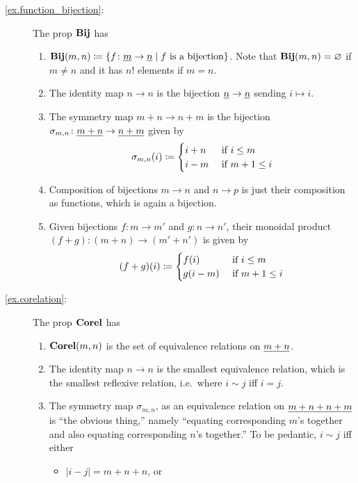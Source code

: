 \documentclass[7Sketches]{subfiles}
\begin{document}
{
\begin{description}
	\item[\cref{ex.function_bijection}:] The prop $\mathbf{Bij}$ has
	\begin{enumerate}
		\item $\mathbf{Bij}(m,n)\coloneqq\{f\colon\underline{{m}}\to\underline{{n}}\mid f\text{ is a bijection}\}$. Note that $\mathbf{Bij}(m,n)=\varnothing$ if $m\neq n$ and it has $n!$ elements if $m=n$.
		\item The identity map $n\to n$ is the bijection $\underline{{n}}\to\underline{{n}}$ sending $i\mapsto i$.
		\item The symmetry map $m+n\to n+m$ is the bijection $\sigma_{m,n}\colon\underline{{m+n}}\to\underline{{n+m}}$ given by
		\[
  		\sigma_{m,n}(i)\coloneqq
  		\begin{cases}
  			i+n&\textnormal{ if }i\leq m\\
				i-m&\textnormal{ if }m+1\leq i
  		\end{cases}
		\]
		\item Composition of bijections $m\to n$ and $n\to p$ is just their composition as functions, which is again a bijection.
		\item Given bijections $f\colon m\to m'$ and $g\colon n\to n'$, their monoidal product $(f+g)\colon (m+n)\to(m'+n')$ is given by
		\[
			(f+g)(i)\coloneqq
			\begin{cases}
				f(i)&\textnormal{ if }i\leq m\\
				g(i-m)&\textnormal{ if }m+1\leq i
			\end{cases}
		\]
	\end{enumerate}
	\item[\cref{ex.corelation}:] The prop $\mathbf{Corel}$ has
	\begin{enumerate}
		\item $\mathbf{Corel}(m,n)$ is the set of equivalence relations on $\underline{{m+n}}$.
		\item The identity map $n\to n$ is the smallest equivalence relation, which is the smallest reflexive relation, i.e.\ where $i\sim j$ iff $i=j$.
		\item The symmetry map $\sigma_{m,n}$, as an equivalence relation on $\underline{{m+n+n+m}}$ is ``the obvious thing,'' namely ``equating corresponding $m$'s together and also equating corresponding $n$'s together.'' To be pedantic, $i\sim j$ iff either
		\begin{itemize}
			\item $|i-j|=m+n+n$, or

\end{itemize}
\end{enumerate}
\end{description}}
\end{document}
